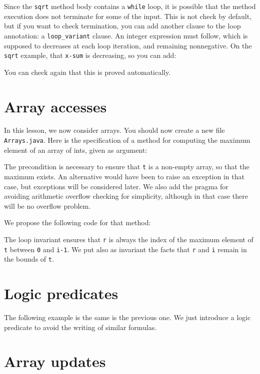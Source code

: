 \documentclass[a4paper,11pt,twoside,openright]{report}
\begin{document}
Since the \texttt{sqrt} method body contains a \texttt{while} loop, it
is possible that the method execution does not terminate for some of
the input. This is not check by default, but if you want to check
termination, you can add another clause to the loop annotation: a
\texttt{loop\_variant} clause. An integer expression must follow, which is
supposed to decreases at each loop iteration, and remaining
nonnegative. On the \texttt{sqrt} example, that \texttt{x-sum} is
decreasing, so you can add:


You can check again that this is proved automatically.

\section{Array accesses}

In this lesson, we now consider arrays. You should now create a new
file \verb|Arrays.java|. Here is the specification of a method for computing 
the maximum element of an array of ints, given as argument:

The precondition is necessary to ensure that \verb|t| is a non-empty
array, so that the maximum exists. An alternative would have been to
raise an exception in that case, but exceptions will be considered
later. We also add the pragma for avoiding arithmetic overflow
checking for simplicity, although in that case there will be no
overflow problem.

We propose the following code for that method:

The loop invariant ensures that \verb|r| is always the index of the maximum
element of \verb|t| between \verb|0| and \verb|i-1|. We put also as
invariant the facts that \verb|r| and \verb|i| remain in the bounds of
\verb|t|. 


\section{Logic predicates}


The following example is the same is the previous one. We just
introduce a logic predicate to avoid the writing of similar formulas.
 



\section{Array updates}
\end{document}
